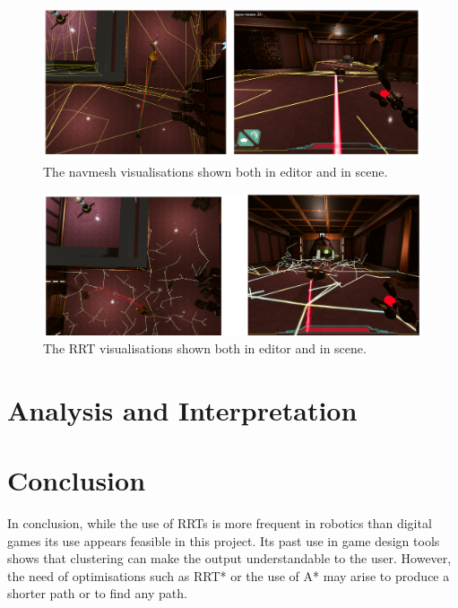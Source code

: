 \documentclass[journal]{IEEEtran}
\begin{document}
\begin{figure}[h]
	\includegraphics[width=1.0\linewidth]{NavmeshVis.png}
	\caption{The navmesh visualisations shown both in editor and in scene.}
	\label{image:navmeshVisuals}
\end{figure}  


\begin{figure}[h]
	\includegraphics[width=1.0\linewidth]{RRTVis.png}
	\caption{The RRT visualisations shown both in editor and in scene.}
	\label{image:RRTVisuals}
\end{figure}  

\section{Analysis and Interpretation}


\section{Conclusion} 
In conclusion, while the use of RRTs is more frequent in robotics than digital games its use appears feasible in this project. Its past use in game design tools shows that clustering can make the output understandable to the user. However, the need of optimisations such as RRT* or the use of A* may arise to produce a shorter path or to find any path. 
\end{document}
